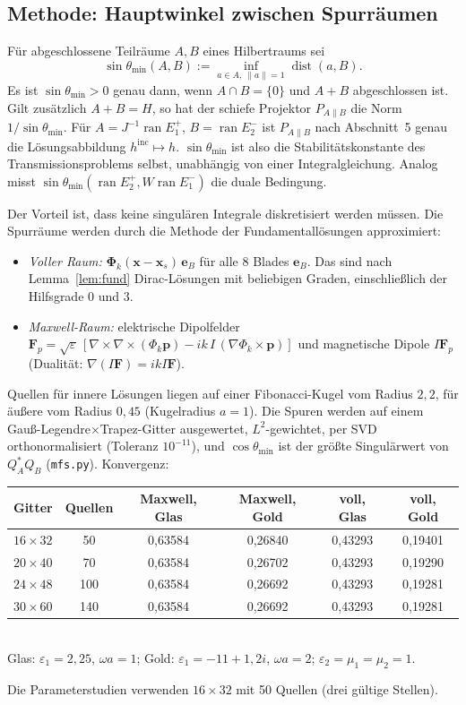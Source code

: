 \documentclass[11pt, a4paper]{article}
\newcommand{\mvec}[1]{\boldsymbol{#1}}
\theoremstyle{plain}
\theoremstyle{definition}
\begin{document}
\subsection{Methode: Hauptwinkel zwischen Spurräumen}

Für abgeschlossene Teilräume $A,B$ eines Hilbertraums sei
\[
  \sin\theta_{\min}(A,B) := \inf_{a\in A,\ \|a\|=1}\operatorname{dist}(a,B).
\]
Es ist $\sin\theta_{\min}>0$ genau dann, wenn $A\cap B=\{0\}$ und $A+B$
abgeschlossen ist. Gilt zusätzlich $A+B = H$, so hat der schiefe Projektor
$P_{A\parallel B}$ die Norm $1/\sin\theta_{\min}$. Für $A = J^{-1}\operatorname{ran}E_1^+$,
$B = \operatorname{ran}E_2^-$ ist $P_{A\parallel B}$ nach Abschnitt~5 genau die
Lösungsabbildung $h^{\mathrm{inc}}\mapsto h$. $\sin\theta_{\min}$ ist also die
Stabilitätskonstante des Transmissionsproblems selbst, unabhängig von einer
Integralgleichung. Analog misst $\sin\theta_{\min}(\operatorname{ran}E_2^+,
W\operatorname{ran}E_1^-)$ die duale Bedingung.

Der Vorteil ist, dass keine singulären Integrale diskretisiert werden müssen.
Die Spurräume werden durch die Methode der Fundamentallösungen approximiert:
\begin{itemize}[leftmargin=*]
  \item \emph{Voller Raum:} $\mvec{\Phi}_k(\mvec{x}-\mvec{x}_s)\,\mvec{e}_B$ für alle
    8 Blades $\mvec{e}_B$. Das sind nach Lemma~\ref{lem:fund} Dirac-Lösungen mit
    beliebigen Graden, einschließlich der Hilfsgrade 0 und 3.
  \item \emph{Maxwell-Raum:} elektrische Dipolfelder $\mvec{F}_p =
    \sqrt\varepsilon\,[\nabla\times\nabla\times(\Phi_k\mvec{p}) - ik\,I\,(\nabla\Phi_k\times\mvec{p})]$
    und magnetische Dipole $I\mvec{F}_p$ (Dualität: $\nabla(I\mvec{F}) = ikI\mvec{F}$).
\end{itemize}
Quellen für innere Lösungen liegen auf einer Fibonacci-Kugel vom Radius $2{,}2$,
für äußere vom Radius $0{,}45$ (Kugelradius $a=1$). Die Spuren werden auf
einem Gauß-Legendre$\times$Trapez-Gitter ausgewertet, $L^2$-gewichtet, per SVD
orthonormalisiert (Toleranz $10^{-11}$), und $\cos\theta_{\min}$ ist der größte
Singulärwert von $Q_A^{*}Q_B$ (\texttt{mfs.py}). Konvergenz:

\begin{center}\small
\begin{tabular}{cccccc}
\toprule
Gitter & Quellen & Maxwell, Glas & Maxwell, Gold & voll, Glas & voll, Gold\\
\midrule
$16\times32$ & 50 & 0,63584 & 0,26840 & 0,43293 & 0,19401\\
$20\times40$ & 70 & 0,63584 & 0,26702 & 0,43293 & 0,19290\\
$24\times48$ & 100 & 0,63584 & 0,26692 & 0,43293 & 0,19281\\
$30\times60$ & 140 & 0,63584 & 0,26692 & 0,43293 & 0,19281\\
\bottomrule
\end{tabular}\\[2pt]
{\footnotesize Glas: $\varepsilon_1 = 2{,}25$, $\omega a=1$; Gold: $\varepsilon_1 = -11+1{,}2i$, $\omega a=2$; $\varepsilon_2=\mu_1=\mu_2=1$.}
\end{center}
Die Parameterstudien verwenden $16\times32$ mit 50 Quellen (drei gültige Stellen).
\end{document}
